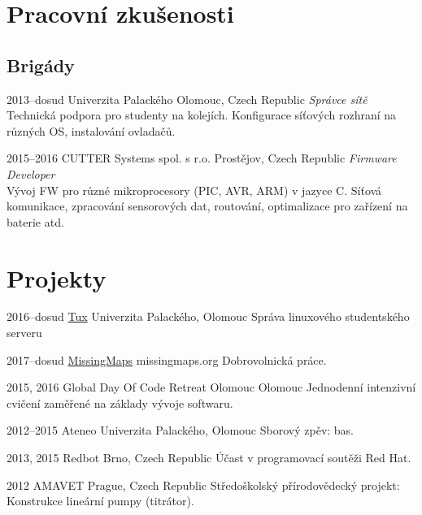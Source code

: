 \documentclass[]{friggeri-cv} %
\begin{document}

\section{Pracovní zkušenosti}
\subsection{Brigády}
\begin{entrylist}

\entry
{2013--dosud}
{Univerzita Palackého}
{Olomouc, Czech Republic}
{\emph{Správce sítě} \\
Technická podpora pro studenty na kolejích. Konfigurace síťových rozhraní na různých OS, instalování ovladačů.}

\entry
{2015--2016}
{CUTTER Systems spol. s r.o.}
{Prostějov, Czech Republic}
{\emph{Firmware Developer} \\
Vývoj FW pro různé mikroprocesory (PIC, AVR, ARM) v jazyce C. Síťová komunikace, zpracování sensorových dat, routování, optimalizace pro zařízení na baterie atd.}

\end{entrylist}

\section{Projekty}

\begin{entrylist}

\entry
{2016--dosud}
{\href{https://tux.inf.upol.cz}{Tux}}
{Univerzita Palackého, Olomouc}
{Správa linuxového studentského serveru}

\entry
{2017--dosud}
{\href{http://www.missingmaps.org/users/\#/5438501}{MissingMaps}}
{missingmaps.org}
{Dobrovolnická práce.}

\entry
{2015, 2016}
{Global Day Of Code Retreat Olomouc}
{Olomouc}
{Jednodenní intenzivní cvičení zaměřené na základy vývoje softwaru.}

\entry
{2012--2015}
{Ateneo}
{Univerzita Palackého, Olomouc}
{Sborový zpěv: bas.}

\entry
{2013, 2015}
{Redbot}
{Brno, Czech Republic}
{Účast v programovací soutěži Red Hat.}

\entry
{2012}
{AMAVET}
{Prague, Czech Republic}
{Středoškolský přírodovědecký projekt: Konstrukce lineární pumpy (titrátor).}

\end{entrylist}
\end{document}
